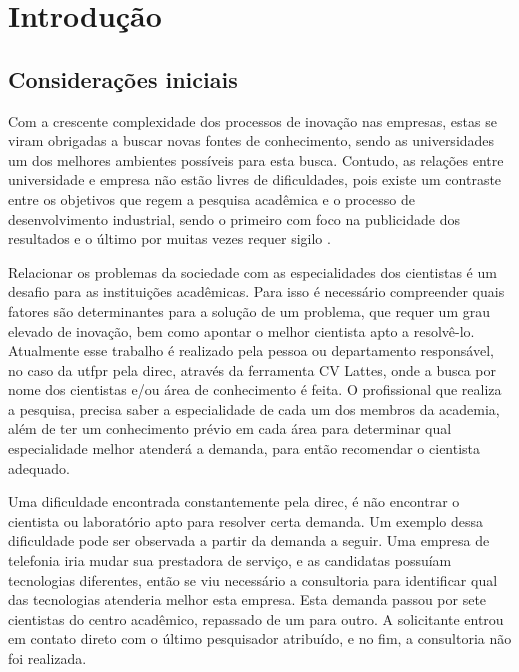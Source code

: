 \chapter{Introdução}\label{cap:introducao}

\section{Considerações iniciais}\label{sec:consideracoesIniciais}

Com a crescente complexidade dos processos de inovação nas empresas, estas se viram obrigadas a buscar novas fontes de conhecimento, sendo as universidades um dos melhores ambientes possíveis para esta busca. Contudo, as relações entre universidade e empresa não estão livres de dificuldades, pois existe um contraste entre os objetivos que regem a pesquisa acadêmica e o processo de desenvolvimento industrial, sendo o primeiro com foco na publicidade dos resultados e o último por muitas vezes requer sigilo \cite{UnicampIE}. 

Relacionar os problemas da sociedade com as especialidades dos cientistas é um desafio para as instituições acadêmicas. Para isso é necessário compreender quais fatores são determinantes para a solução de um problema, que requer um grau elevado de inovação, bem como apontar o melhor cientista apto a resolvê-lo. Atualmente esse trabalho é realizado pela pessoa ou departamento responsável, no caso da \gls{utfpr} pela \gls{direc}, através da ferramenta CV Lattes, onde a busca por nome dos cientistas e/ou área de conhecimento é feita. O profissional que realiza a pesquisa, precisa saber a especialidade de cada um dos membros da academia, além de ter um conhecimento prévio em cada área para determinar qual especialidade melhor atenderá a demanda, para então recomendar o cientista adequado.

Uma dificuldade encontrada constantemente pela \gls{direc}, é não encontrar o cientista ou laboratório apto para resolver certa demanda. Um exemplo dessa dificuldade pode ser observada a partir da demanda a seguir. Uma empresa de telefonia iria mudar sua prestadora de serviço, e as candidatas possuíam tecnologias diferentes, então se viu necessário a consultoria para identificar qual das tecnologias atenderia melhor esta empresa. Esta demanda passou por sete cientistas do centro acadêmico, repassado de um para outro. A solicitante entrou em contato direto com o último pesquisador atribuído, e no fim, a consultoria não foi realizada.

